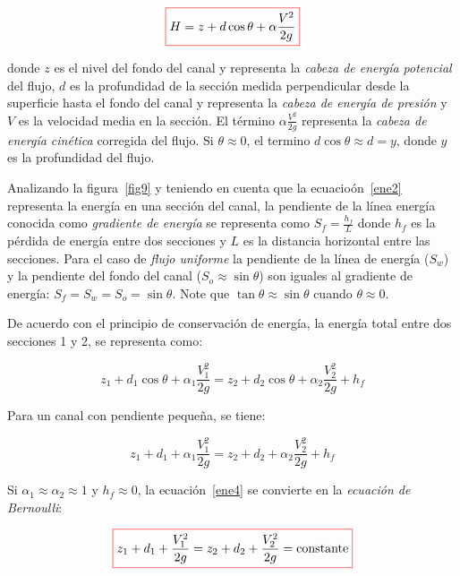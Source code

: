 \documentclass[11pt, oneside]{article}
\begin{document}
\begin{equation}
\color{red}\boxed{\color{black} H = z + d \cos \theta + \alpha\frac{V^2}{2g} }
\label{ene2}
\end{equation}

donde $z$ es el nivel del fondo del canal y representa la \emph{cabeza de energ\'ia potencial} del flujo, $d$ es la profundidad de la secci\'on medida perpendicular desde la superficie hasta el fondo del canal y representa la \emph{cabeza de energ\'ia de presi\'on} y $V$ es la velocidad media en la secci\'on. El t\'ermino $\alpha \frac{V^2}{2g}$ representa la \emph{cabeza de energ\'ia cin\'etica} corregida del flujo. Si $\theta \approx 0$, el termino $d \cos \theta \approx d = y$, donde $y$ es la profundidad del flujo. 

Analizando la figura~\ref{fig9} y teniendo en cuenta que la ecuacio\'on~\ref{ene2} representa la energ\'ia en una secci\'on del canal, la pendiente de la l\'inea energ\'ia conocida como \emph{gradiente de energ\'ia} se representa como $S_f=\frac{h_f}{L}$ donde $h_f$ es la p\'erdida de energ\'ia entre dos secciones y $L$ es la distancia horizontal entre las secciones. Para el caso de \emph{flujo uniforme} la pendiente de la l\'inea de energ\'ia ($S_w$) y la pendiente del fondo del canal ($S_o \approx \sin \theta$) son iguales al gradiente de energ\'ia: $S_f = S_w = S_o = \sin \theta$. Note que $\tan \theta \approx \sin \theta$ cuando $\theta \approx 0$. 

De acuerdo con el principio de conservaci\'on de energ\'ia, la energ\'ia total entre dos secciones 1 y 2, se representa como:

\begin{equation}
z_1 + d_1 \cos \theta + \alpha_1 \frac{V_1^2}{2g} = z_2 + d_2 \cos \theta + \alpha_2 \frac{V_2^2}{2g} + h_{f}
\label{ene3}
\end{equation}

Para un canal con pendiente peque\~na, se tiene:

\begin{equation}
 z_1 + d_1 + \alpha_1 \frac{V_1^2}{2g} = z_2 + d_2 + \alpha_2 \frac{V_2^2}{2g} + h_{f}
\label{ene4}
\end{equation}

Si $\alpha_1 \approx \alpha_2 \approx 1$ y $h_f \approx 0$, la ecuaci\'on~\ref{ene4} se convierte en la \emph{ecuaci\'on de Bernoulli}:

\begin{equation}
\color{red}\boxed{\color{black} z_1 + d_1 + \frac{V_1^2}{2g} = z_2 + d_2 + \frac{V_2^2}{2g} = \text{constante}}
\label{ene5}
\end{equation}
\end{document}
